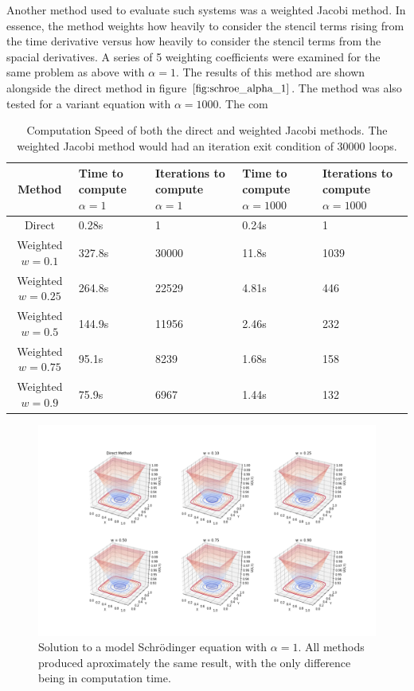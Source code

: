 \documentclass[twocolumn]{article}
\begin{document}
Another method used to evaluate such systems was a weighted Jacobi method. In essence, the method weights how heavily to consider the stencil terms rising from the time derivative versus how heavily to consider the stencil terms from the spacial derivatives. A series of 5 weighting coefficients were examined for the same problem as above with $\alpha = 1$. The results of this method are shown alongside the direct method in figure $\ref{fig:schroe_alpha_1}$. The method was also tested for a variant equation with $\alpha=1000$. The com

\begin{table}
	\begin{center}
\begin{tabular}{|c|p{2cm}|p{2cm}|p{2cm}|p{2cm}|}
	\hline  Method& Time to compute $\alpha=1$ & Iterations to compute $\alpha=1$ & Time to compute $\alpha=1000$ & Iterations to compute $\alpha = 1000$ \\ 
	\hline
	Direct & 0.28s & 1  & 0.24s & 1 \\ 
	\hline
	Weighted $w=0.1$  & 327.8s & 30000 & 11.8s & 1039 \\ 
	\hline
	Weighted $w=0.25$  & 264.8s  & 22529 & 4.81s & 446\\ 
	\hline
	Weighted $w=0.5$  & 144.9s & 11956 & 2.46s & 232 \\ 
	\hline
	Weighted $w=0.75$  & 95.1s & 8239 & 1.68s & 158 \\ 
	\hline
	Weighted $w=0.9$  & 75.9s & 6967 & 1.44s & 132\\ 
	\hline 
\end{tabular} 
\caption{Computation Speed of both the direct and weighted Jacobi methods. The weighted Jacobi method would had an iteration exit condition of $30000$ loops.}
\label{Jacobi compare}
	\end{center}
\end{table}

\begin{figure}
\centering
\includegraphics[width=\textwidth]{schroe_alpha_1}
\caption{Solution to a model Schr\"{o}dinger equation with $\alpha=1$. All methods produced aproximately the same result, with the only difference being in computation time.}
\label{fig:schroe_alpha_1}
\end{figure}
\end{document}

